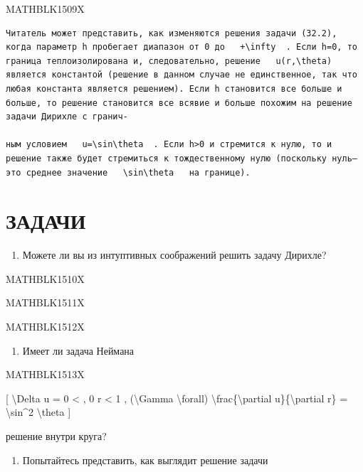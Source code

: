 \documentclass[
]{article}
\providecommand{\tightlist}{%
  \setlength{\itemsep}{0pt}\setlength{\parskip}{0pt}}
\begin{document}
MATHBLK1509X

\begin{verbatim}
Читатель может представить, как изменяются решения задачи (32.2), когда параметр h пробегает диапазон от 0 до   +\infty  . Если h=0, то граница теплоизолирована и, следовательно, решение   u(r,\theta)   является константой (решение в данном случае не единственное, так что любая константа является решением). Если h становится все больше и больше, то решение становится все всявие и больше похожим на решение задачи Дирихле с гранич-

ным условием   u=\sin\theta  . Если h>0 и стремится к нулю, то и решение также будет стремиться к тождественному нулю (поскольку нуль—это среднее значение   \sin\theta   на границе).
\end{verbatim}

\section{ЗАДАЧИ}\label{ux437ux430ux434ux430ux447ux438-12}

\begin{enumerate}
\def\labelenumi{\arabic{enumi}.}
\tightlist
\item
  Можете ли вы из интуптивных соображений решить задачу Дирихле?
\end{enumerate}

MATHBLK1510X

MATHBLK1511X

MATHBLK1512X

\begin{enumerate}
\def\labelenumi{\arabic{enumi}.}
\setcounter{enumi}{1}
\tightlist
\item
  Имеет ли задача Неймана
\end{enumerate}

MATHBLK1513X

{[} \textbackslash Delta u = 0 \textless{} , 0 r \textless{} 1 ,
(\textbackslash Gamma \textbackslash forall)
\textbackslash frac\{\textbackslash partial u\}\{\textbackslash partial
r\} = \textbackslash sin\^{}2 \textbackslash theta {]}

решение внутри круга?

\begin{enumerate}
\def\labelenumi{\arabic{enumi}.}
\setcounter{enumi}{2}
\tightlist
\item
  Попытайтесь представить, как выглядит решение задачи
\end{enumerate}
\end{document}
